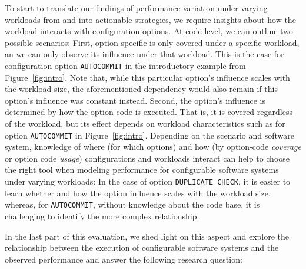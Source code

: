 To start to translate our findings of performance variation under varying workloads from  and  into actionable strategies, we require insights about how the workload interacts with configuration options. At code level, we can outline two possible scenarios: First, option-specific is only covered under a specific workload, an we can only observe its influence under that workload. This is the case for configuration option \texttt{AUTOCOMMIT} in the introductory example from Figure~\ref{fig:intro}. Note that, while this particular option's influence scales with the workload size, the aforementioned dependency would also remain if this option's influence was constant instead. Second, the option's influence is determined by how the option code is executed. That is, it is covered regardless of the workload, but its effect depends on workload characteristics such as for option \texttt{AUTOCOMMIT} in Figure~\ref{fig:intro}.
Depending on the scenario and software system, knowledge of where (for which options) and how (by option-code \textit{coverage} or option code \textit{usage}) configurations and workloads interact can help to choose the right tool when modeling performance for configurable software systems under varying workloads: In the case of option \texttt{DUPLICATE\_CHECK}, it is easier to learn whether and how the option influence scales with the workload size, whereas, for \texttt{AUTOCOMMIT}, without knowledge about the code base, it is challenging to identify the more complex relationship.

In the last part of this evaluation, we shed light on this aspect and explore the relationship between the execution of configurable software systems and the observed performance and answer the following research question:

